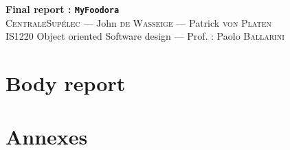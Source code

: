 \documentclass[12pt,oneside,a4paper]{article}
\begin{document}
\begin{center}
{\LARGE \bfseries 
  Final report : \texttt{MyFoodora}\\[0.1cm] 
}
{\large
  \textsc{CentraleSupélec} --- John \textsc{de Wasseige} --- Patrick \textsc{von Platen}\\[0.3cm]
}
{\normalsize
  IS1220 Object oriented Software design --- Prof. : Paolo \textsc{Ballarini} \\[0.9cm]
}
\end{center}

{\hypersetup{linkcolor=black} \tableofcontents}
\newpage

\part{Body report}
 
\newpage
 
\newpage
 
\newpage
 
\newpage
 
\newpage
 
\newpage

\newpage

\part{Annexes}
\appendix

\newpage

\newpage

\newpage

\nocite{*}
\hypersetup{urlcolor=black}
\printbibliography
\end{document}
